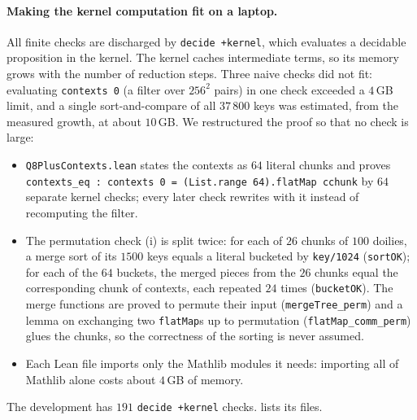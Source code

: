 \documentclass[11pt]{article}
\theoremstyle{definition}
\theoremstyle{remark}
\begin{document}
\paragraph{Making the kernel computation fit on a laptop.}
All finite checks are discharged by \texttt{decide +kernel}, which evaluates a decidable proposition in the kernel.
The kernel caches intermediate terms, so its memory grows with the number of reduction steps.
Three naive checks did not fit: evaluating \texttt{contexts 0} (a filter over $256^2$ pairs) in one check exceeded a $4$\,GB limit, and a single sort-and-compare of all $37\,800$ keys was estimated, from the measured growth, at about $10$\,GB.
We restructured the proof so that no check is large:
\begin{itemize}[leftmargin=*]
\item \texttt{Q8PlusContexts.lean} states the contexts as $64$ literal chunks and proves \texttt{contexts\_eq : contexts 0 = (List.range 64).flatMap cchunk} by $64$ separate kernel checks; every later check rewrites with it instead of recomputing the filter.
\item The permutation check (i) is split twice: for each of $26$ chunks of $100$ doilies, a merge sort of its $1500$ keys equals a literal bucketed by \texttt{key/1024} (\texttt{sortOK}); for each of the $64$ buckets, the merged pieces from the $26$ chunks equal the corresponding chunk of contexts, each repeated $24$ times (\texttt{bucketOK}).
The merge functions are proved to permute their input (\texttt{mergeTree\_perm}) and a lemma on exchanging two \texttt{flatMap}s up to permutation (\texttt{flatMap\_comm\_perm}) glues the chunks, so the correctness of the sorting is never assumed.
\item Each Lean file imports only the Mathlib modules it needs: importing all of Mathlib alone costs about $4$\,GB of memory.
\end{itemize}
The development has $191$ \texttt{decide +kernel} checks.  lists its files.
\end{document}

